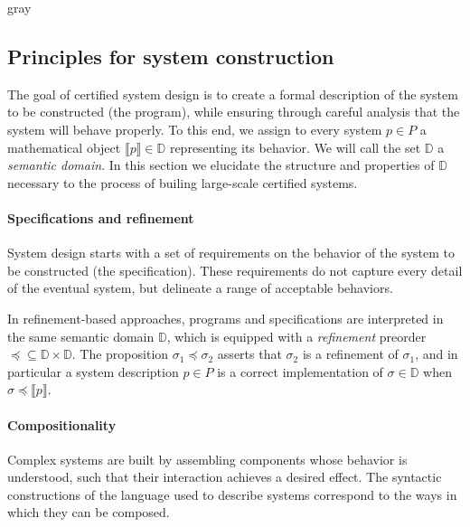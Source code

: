 \documentclass[acmsmall,authordraft]{acmart}
\newcommand{\refby}{\preceq}
\begin{document}
\begin{color}{gray}
\subsection{Principles for system construction} \label{sec:principles} %


The goal of certified system design is
to create a formal description of
the system to be constructed (the program),
while ensuring
through careful analysis
that the system
will behave properly.
To this end,
we assign
to every system $p \in P$
a mathematical object $\llbracket p \rrbracket \in \mathbb{D}$
representing its behavior.
We will call the set $\mathbb{D}$ a \emph{semantic domain}.
In this section we elucidate
the structure and properties of $\mathbb{D}$
necessary to the process of builing
large-scale certified systems.


\paragraph{Specifications and refinement} %

System design starts with a set of requirements
on the behavior of the system to be constructed
(the specification).
These requirements do not capture every detail
of the eventual system,
but delineate a range of acceptable behaviors.

In refinement-based approaches,
programs and specifications are interpreted in the same
semantic domain $\mathbb{D}$,
which is equipped with a \emph{refinement} preorder
${\refby} \subseteq \mathbb{D} \times \mathbb{D}$.
The proposition $\sigma_1 \refby \sigma_2$
asserts that $\sigma_2$ is a refinement of $\sigma_1$,
and in particular a system description $p \in P$ is a correct implementation
of $\sigma \in \mathbb{D}$ when
$\sigma \refby \llbracket p \rrbracket$.


\paragraph{Compositionality} %

Complex systems are built by assembling components
whose behavior is understood,
such that their interaction achieves a desired effect.
The syntactic constructions of
the language used to describe systems
correspond to the ways in which they can be composed.


\end{color}
\end{document}
